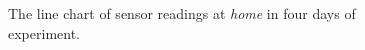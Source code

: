 \begin{figure}[H]
\begin{adjustwidth}{-1cm}{}
{{    }
  }
  \end{adjustwidth}
  \caption[The line chart of sensor readings at home.]
  {The line chart of sensor readings at \textit{home} in four days of experiment.}
  \label{fig:result-home-line-chart}
\end{figure}



